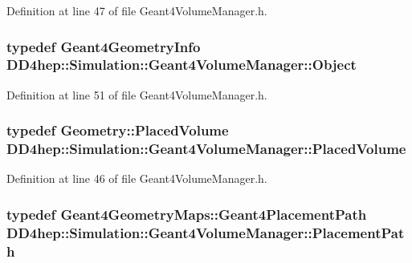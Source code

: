 Definition at line 47 of file Geant4VolumeManager.h.\hypertarget{class_d_d4hep_1_1_simulation_1_1_geant4_volume_manager_a0c6cb7e6e021022e0b22937e5fb6e009}{
\subsubsection[{Object}]{\setlength{\rightskip}{0pt plus 5cm}typedef {\bf Geant4GeometryInfo} {\bf DD4hep::Simulation::Geant4VolumeManager::Object}}}
\label{class_d_d4hep_1_1_simulation_1_1_geant4_volume_manager_a0c6cb7e6e021022e0b22937e5fb6e009}


Definition at line 51 of file Geant4VolumeManager.h.\hypertarget{class_d_d4hep_1_1_simulation_1_1_geant4_volume_manager_a5303c9cd0941b91ab010074947517bd6}{
\subsubsection[{PlacedVolume}]{\setlength{\rightskip}{0pt plus 5cm}typedef {\bf Geometry::PlacedVolume} {\bf DD4hep::Simulation::Geant4VolumeManager::PlacedVolume}}}
\label{class_d_d4hep_1_1_simulation_1_1_geant4_volume_manager_a5303c9cd0941b91ab010074947517bd6}


Definition at line 46 of file Geant4VolumeManager.h.\hypertarget{class_d_d4hep_1_1_simulation_1_1_geant4_volume_manager_a990d8577e764541c4914263db1c6b0ca}{
\subsubsection[{PlacementPath}]{\setlength{\rightskip}{0pt plus 5cm}typedef {\bf Geant4GeometryMaps::Geant4PlacementPath} {\bf DD4hep::Simulation::Geant4VolumeManager::PlacementPath}}}
\label{class_d_d4hep_1_1_simulation_1_1_geant4_volume_manager_a990d8577e764541c4914263db1c6b0ca}


